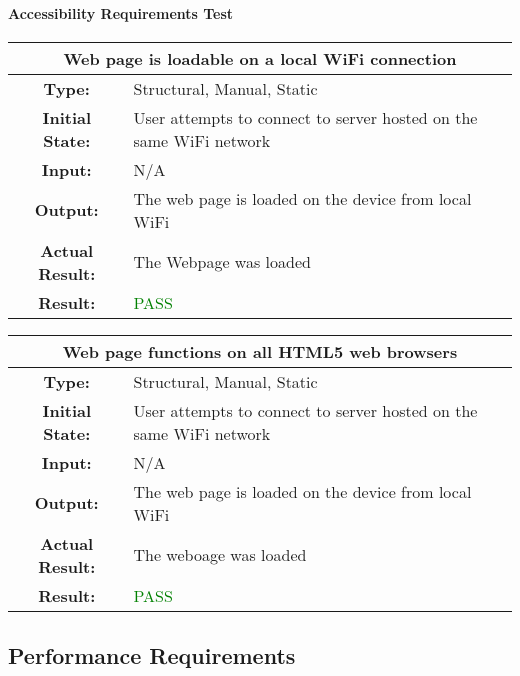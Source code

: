 \documentclass[12pt, titlepage]{article}
\begin{document}
\paragraph{Accessibility Requirements Test}

\begin{center}
\begin{table}[H]
\begin{tabularx}{\textwidth}{| c X |}
\hline
\multicolumn{2}{|c|}{\textbf{Web page is loadable on a local WiFi connection}}\\
\hline
\textbf{Type: } & Structural, Manual, Static\\
\textbf{Initial State: } & User attempts to connect to server hosted on the same WiFi network\\
\textbf{Input: } & N/A\\
\textbf{Output: } & The web page is loaded on the device from local WiFi \\
\textbf{Actual Result:  } & The Webpage was loaded \\
\textbf{Result: } & \textcolor{green}{PASS}\\
\hline
\end{tabularx}
\end{table}
\end{center}

\begin{center}
\begin{table}[H]
\begin{tabularx}{\textwidth}{| c X |}
\hline
\multicolumn{2}{|c|}{\textbf{Web page functions on all HTML5 web browsers}}\\
\hline
\textbf{Type: } & Structural, Manual, Static\\
\textbf{Initial State: } & User attempts to connect to server hosted on the same WiFi network\\
\textbf{Input: } & N/A\\
\textbf{Output: } & The web page is loaded on the device from local WiFi \\
\textbf{Actual Result:  } & The weboage was loaded \\
\textbf{Result: } & \textcolor{green}{PASS}\\
\hline

\end{tabularx}
\end{table}
\end{center}

\subsection{Performance Requirements}
\end{document}
